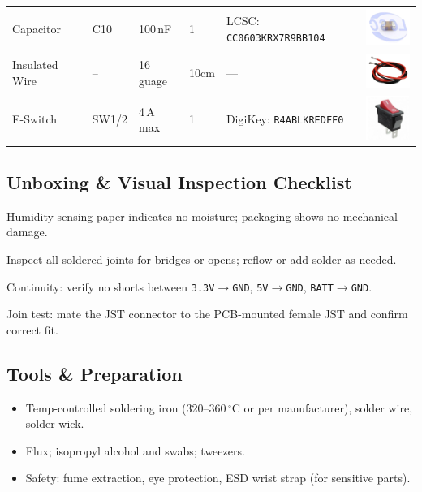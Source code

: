 \begin{manualblock}
\begin{longtable}{@{}m{2.2cm}m{1cm}m{2cm}m{1cm}m{4.5cm}m{2.5cm}@{}}
Capacitor & C10 & 100\,nF & 1 & LCSC: \texttt{CC0603KRX7R9BB104} & \includegraphics[width=1.8cm]{img/manual/item5.png}\\
Insulated Wire & -- & 16\,guage & 10cm & --- & \includegraphics[width=1.8cm]{img/manual/item6.png}\\
E-Switch & SW1/2 & 4\,A max & 1 & DigiKey: \texttt{R4ABLKREDFF0} & \includegraphics[width=1.4cm]{img/manual/item7.png}\\
\bottomrule
\end{longtable}

\pagebreak
\subsection*{Unboxing \& Visual Inspection Checklist}
\checkbox{} Humidity sensing paper indicates no moisture; packaging shows no mechanical damage.

\checkbox{} Inspect all soldered joints for bridges or opens; reflow or add solder as needed.

\checkbox{} Continuity: verify no shorts between \texttt{3.3V$\rightarrow$GND}, \texttt{5V$\rightarrow$GND}, \texttt{BATT$\rightarrow$GND}.

\checkbox{} Join test: mate the JST connector to the PCB-mounted female JST and confirm correct fit.

\subsection*{Tools \& Preparation}
\begin{itemize}
  \item Temp-controlled soldering iron (320--360\,$^{\circ}$C or per manufacturer), solder wire, solder wick.
  \item Flux; isopropyl alcohol and swabs; tweezers.
  \item Safety: fume extraction, eye protection, ESD wrist strap (for sensitive parts).
\end{itemize}


\end{manualblock}
